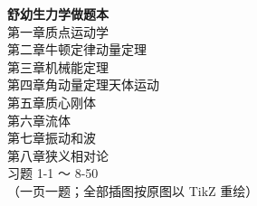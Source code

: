 \documentclass[12pt,a4paper,openany]{ctexbook}
\begin{document}
\thispagestyle{empty}
\begin{titlepage}
\begin{center}
\vspace*{2.2cm}
{\Huge\bfseries 舒幼生力学做题本}\\[1cm]
{\LARGE 第一章\quad 质点运动学}\\[0.25cm]
{\LARGE 第二章\quad 牛顿定律\quad 动量定理}\\[0.25cm]
{\LARGE 第三章\quad 机械能定理}\\[0.25cm]
{\LARGE 第四章\quad 角动量定理\quad 天体运动}\\[0.25cm]
{\LARGE 第五章\quad 质心\quad 刚体}\\[0.25cm]
{\LARGE 第六章\quad 流体}\\[0.25cm]
{\LARGE 第七章\quad 振动和波}\\[0.25cm]
{\LARGE 第八章\quad 狭义相对论}\\[0.6cm]
{\large 习题 1-1 ～ 8-50}\\[0.4cm]
{\large （一页一题；全部插图按原图以 TikZ 重绘）}
\vspace{1.6cm}
\end{center}
\end{titlepage}









\end{document}
